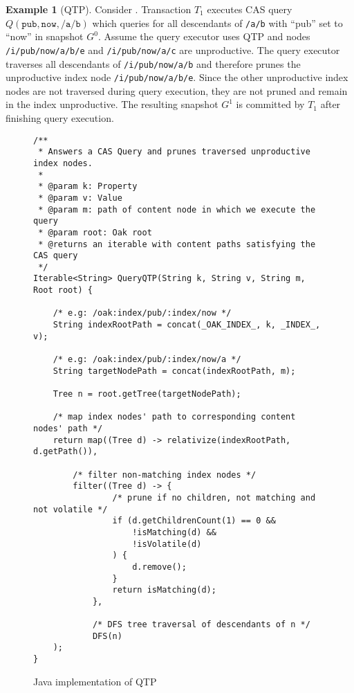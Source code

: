 \message{ !name(thesis.tex)}\documentclass[abstracton,12pt]{scrartcl}
\theoremstyle{definition}
\newtheorem{example}{Example}
\begin{document}
\begin{example}[QTP]
  Consider . Transaction $T_1$ executes CAS query
  $Q(\texttt{pub},\texttt{now},\texttt{/a/b})$ which queries for all descendants
  of \texttt{/a/b} with ``pub'' set to ``now'' in snapshot $G^0$. Assume the
  query executor uses QTP and nodes \texttt{/i/pub/now/a/b/e} and
  \texttt{/i/pub/now/a/c} are unproductive. The
  query executor traverses all descendants of \texttt{/i/pub/now/a/b} and
  therefore prunes the unproductive index node \texttt{/i/pub/now/a/b/e}. Since
  the other unproductive index nodes are not traversed during query execution,
  they are not pruned and remain in the index unproductive. The resulting
  snapshot $G^1$ is committed by $T_1$ after finishing query execution.
\end{example}

\begin{figure}[H]
  \small
  \begin{framed}    
\begin{verbatim}
/**
 * Answers a CAS Query and prunes traversed unproductive index nodes.
 *
 * @param k: Property
 * @param v: Value
 * @param m: path of content node in which we execute the query
 * @param root: Oak root
 * @returns an iterable with content paths satisfying the CAS query
 */
Iterable<String> QueryQTP(String k, String v, String m, Root root) {

    /* e.g: /oak:index/pub/:index/now */
    String indexRootPath = concat(_OAK_INDEX_, k, _INDEX_, v); 

    /* e.g: /oak:index/pub/:index/now/a */
    String targetNodePath = concat(indexRootPath, m);

    Tree n = root.getTree(targetNodePath);

    /* map index nodes' path to corresponding content nodes' path */
    return map((Tree d) -> relativize(indexRootPath, d.getPath()),

        /* filter non-matching index nodes */
        filter((Tree d) -> {
                /* prune if no children, not matching and not volatile */
                if (d.getChildrenCount(1) == 0 &&
                    !isMatching(d) &&
                    !isVolatile(d)
                ) {
                    d.remove();
                }
                return isMatching(d);
            },

            /* DFS tree traversal of descendants of n */
            DFS(n)
    );
}
\end{verbatim}
  \end{framed}
  \caption{Java implementation of QTP}
  \label{fig:java_qtp}
\end{figure}
\end{document}
